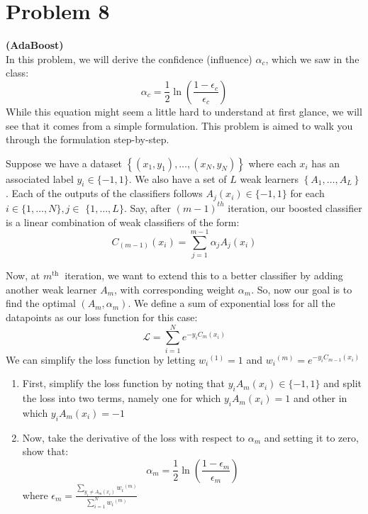 \section*{Problem 8}

\textbf{(AdaBoost)}\\
In this problem, we will derive the confidence (influence) \( \alpha_{c} \), which we saw in the class:
\[
    \alpha_{c}=\frac{1}{2} \ln \left(\frac{1-\epsilon_{c}}{\epsilon_{c}}\right)
\]
While this equation might seem a little hard to understand at first glance, we will see that it comes from a simple formulation.
This problem is aimed to walk you through the formulation step-by-step.

Suppose we have a dataset \( \left \{\left(x_{1}, y_{1}\right), \ldots,\left(x_{N}, y_{N}\right)\right \} \) where each \( x_{i} \) has an associated label \( y_{i} \in \{-1,1\} \).
We also have a set of \( L \) weak learners \( \left \{A_{1}, \ldots, A_{L}\right \} \).
Each of the outputs of the classifiers follows \( A_{j}\left(x_{i}\right) \in \{-1,1\} \) for each \( i \in \{1, \ldots, N\}, j \in \) \( \{1, \ldots, L\} \).
Say, after \( (m-1)^{t h} \) iteration, our boosted classifier is a linear combination of weak classifiers of the form:
\[
    C_{(m-1)}\left(x_{i}\right)=\sum_{j=1}^{m-1} \alpha_{j} A_{j}\left(x_{i}\right)
\]

Now, at \( m^{\text {th }} \) iteration, we want to extend this to a better classifier by adding another weak learner \( A_{m} \), with corresponding weight \( \alpha_{m} \).
So, now our goal is to find the optimal \( \left(A_{m}, \alpha_{m}\right) \).
We define a sum of exponential loss for all the datapoints as our loss function for this case:
\[
    \mathcal{L}=\sum_{i=1}^{N} e^{-y_{i} C_{m}\left(x_{i}\right)}
\]
We can simplify the loss function by letting \( w_{i}{ }^{(1)}=1 \) and \( w_{i}{ }^{(m)}=e^{-y_{i} C_{m-1}\left(x_{i}\right)} \)
\begin{enumerate}[label= (\alph*), noitemsep, topsep=0pt]
    \item First, simplify the loss function by noting that \( y_{i} A_{m}\left(x_{i}\right) \in \{-1,1\} \) and split the loss into two terms, namely one for which \( y_{i} A_{m}\left(x_{i}\right)=1 \) and other in which \( y_{i} A_{m}\left(x_{i}\right)=-1 \)

    \item Now, take the derivative of the loss with respect to \( \alpha_{m} \) and setting it to zero, show that:
          \[
              \alpha_{m}=\frac{1}{2} \ln \left(\frac{1-\epsilon_{m}}{\epsilon_{m}}\right)
          \]
          where \( \epsilon_{m}=\frac{\sum_{y_{i} \neq A_{m}\left(x_{i}\right)} w_{i}{ }^{(m)}}{\sum_{i=1}^{N} w_{i}{ }^{(m)}} \)
\end{enumerate}

